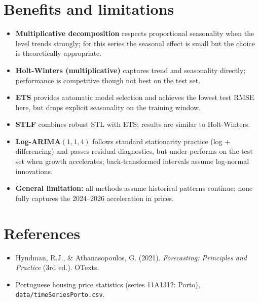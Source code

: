 \documentclass[11pt,a4paper]{article}
\begin{document}
\section{Benefits and limitations}

\begin{itemize}
  \item \textbf{Multiplicative decomposition} respects proportional seasonality when the level trends strongly; for this series the seasonal effect is small but the choice is theoretically appropriate.
  \item \textbf{Holt-Winters (multiplicative)} captures trend and seasonality directly; performance is competitive though not best on the test set.
  \item \textbf{ETS} provides automatic model selection and achieves the lowest test RMSE here, but drops explicit seasonality on the training window.
  \item \textbf{STLF} combines robust STL with ETS; results are similar to Holt-Winters.
  \item \textbf{Log-ARIMA$(1,1,4)$} follows standard stationarity practice (log + differencing) and passes residual diagnostics, but under-performs on the test set when growth accelerates; back-transformed intervals assume log-normal innovations.
  \item \textbf{General limitation:} all methods assume historical patterns continue; none fully captures the 2024--2026 acceleration in prices.
\end{itemize}

\section*{References}
\begin{itemize}
  \item Hyndman, R.J., \& Athanasopoulos, G. (2021). \textit{Forecasting: Principles and Practice} (3rd ed.). OTexts.
  \item Portuguese housing price statistics (series 11A1312: Porto), \texttt{data/timeSeriesPorto.csv}.
\end{itemize}
\end{document}
